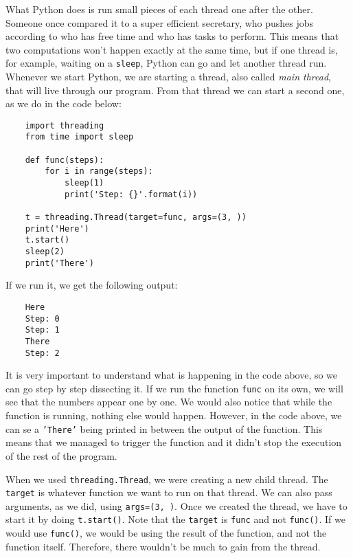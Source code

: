 What Python does is run small pieces of each thread one after the other. Someone once compared it to a super efficient secretary, who pushes jobs according to who has free time and who has tasks to perform. This means that two computations won't happen exactly at the same time, but if one thread is, for example, waiting on a \texttt{sleep}, Python can go and let another thread run. Whenever we start Python, we are starting a thread, also called \emph{main thread}, that will live through our program. From that thread we can start a second one, as we do in the code below:

\begin{verbatim}
    import threading
    from time import sleep

    def func(steps):
        for i in range(steps):
            sleep(1)
            print('Step: {}'.format(i))

    t = threading.Thread(target=func, args=(3, ))
    print('Here')
    t.start()
    sleep(2)
    print('There')
\end{verbatim}

If we run it, we get the following output:

\begin{verbatim}
    Here
    Step: 0
    Step: 1
    There
    Step: 2
\end{verbatim}

It is very important to understand what is happening in the code above, so we can go step by step dissecting it. If we run the function \texttt{func} on its own, we will see that the numbers appear one by one. We would also notice that while the function is running, nothing else would happen. However, in the code above, we can se a \texttt{'There'} being printed in between the output of the function. This means that we managed to trigger the function and it didn't stop the execution of the rest of the program.

When we used \texttt{threading.Thread}, we were creating a new child thread. The \texttt{target} is whatever function we want to run on that thread. We can also pass arguments, as we did, using \texttt{args=(3, )}. Once we created the thread, we have to start it by doing \texttt{t.start()}. Note that the \texttt{target} is \texttt{func} and not \texttt{func()}. If we would use \texttt{func()}, we would be using the result of the function, and not the function itself. Therefore, there wouldn't be much to gain from the thread.


